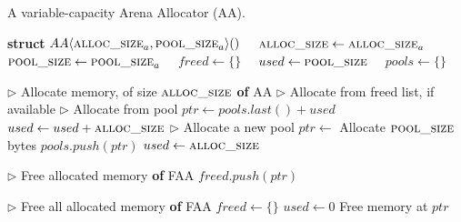 \begin{algorithm}[hbtp]
\caption{A variable-capacity Arena Allocator (AA).}
\label{alg:aa}
\begin{algorithmic}[1]

\Statex

\State \textbf{struct} $AA \langle \textsc{alloc\_size}_a, \textsc{pool\_size}_a \rangle ()$
\State \ \ $\textsc{alloc\_size} \gets \textsc{alloc\_size}_a$  \label{alg:aa--init-const-begin}
\State \ \ $\textsc{pool\_size} \gets \textsc{pool\_size}_a$  \label{alg:aa--init-const-end}
\State \ \ $freed \gets \{\}$  \label{alg:aa--init-begin}
\State \ \ $used \gets \textsc{pool\_size}$ 
\State \ \ $pools \gets \{\}$  \label{alg:aa--init-end}

\Statex

\State $\rhd$ Allocate memory, of size $\textsc{alloc\_size}$
 \textbf{of} AA
  \State $\rhd$ Allocate from freed list, if available
    \label{alg:aa--allocate-freed}
  \EndIf
  \State $\rhd$ Allocate from pool
   \label{alg:aa--allocate-pool-begin}
    \State $ptr \gets pools.last() + used$
    \State $used \gets used + \textsc{alloc\_size}$
  \EndIf \label{alg:aa--allocate-pool-end}
  \State $\rhd$ Allocate a new pool
  \State $ptr \gets$ Allocate $\textsc{pool\_size}$ bytes \label{alg:aa--allocate-newpool}
   \label{alg:aa--allocate-new-begin}
    \State $pools.push(ptr)$
    \State $used \gets \textsc{alloc\_size}$
  \EndIf \label{alg:aa--allocate-new-end}
  \Return{$\phi$} \label{alg:aa--allocate-fail}
\EndFunction

\Statex

\State $\rhd$ Free allocated memory
 \textbf{of} FAA
  \State $freed.push(ptr)$ \label{alg:aa--deallocate-push}
\EndFunction

\Statex

\State $\rhd$ Free all allocated memory
 \textbf{of} FAA
  \State $freed \gets \{\}$ \label{alg:aa--reset-freedused-begin}
  \State $used \gets 0$ \label{alg:aa--reset-freedused-end}
   \label{alg:aa--reset-pools-begin}
    \State Free memory at $ptr$
  \EndFor \label{alg:aa--reset-pools-end}
\EndFunction
\end{algorithmic}
\end{algorithm}
